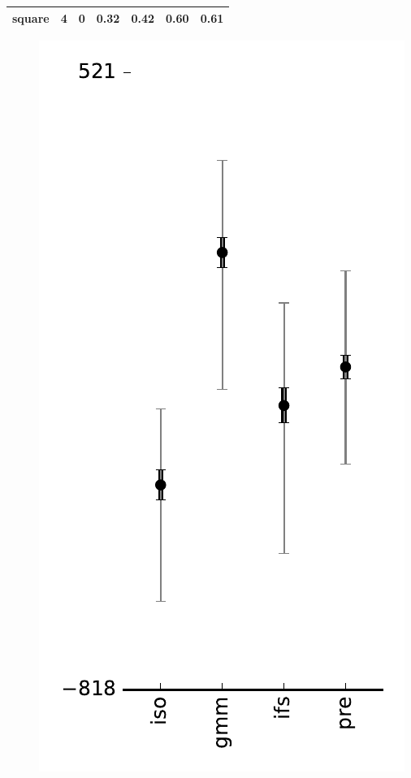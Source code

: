 \documentclass[reprint,amsmath,amssymb,aps,prl]{revtex4-1}
\begin{document}
\begin{figure}[tbh]
\begin{subfigure}{0.49\linewidth}
\begin{subfigure}{\linewidth}
\begin{tabular}{ r r r r r r r}
			square & 4 & 0 & 0.32 & 0.42 & 0.60 & 0.61 \\
			\hline
		\end{tabular}
		\caption{}
		\label{figure:convergence}
	\end{subfigure}
	\begin{subfigure}{\linewidth}
		\begin{subfigure}{0.31\linewidth}  
			\includegraphics[width=\linewidth]{../img/currency/likelihoods.pdf}\\

\end{subfigure}
\end{subfigure}
\end{subfigure}
\end{figure}
\end{document}
